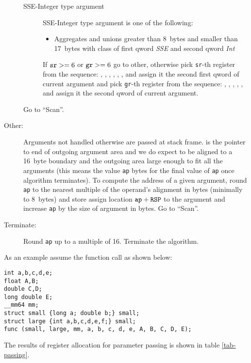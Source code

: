 \begin{description}
\begin{description}
    \item[SSE-Integer type argument]
      SSE-Integer type argument is one of the following:
      \begin{itemize}
        \item Aggregates and unions greater than 8~bytes and smaller than 17~bytes with class of first qword \emph{SSE}
          and second qword \emph{Int}
      \end{itemize}
      If $\verb|sr| >= 6$ or $\verb|gr| >= 6$ go to other, otherwise pick \verb|sr|-th register from
      the sequence:
      , , , , , , 
      and assign it the second first qword of current argument and pick \verb|gr|-th register from
      the sequence:
      \RAX, \RDX, \RCX, \RBX, \RSI, \RDI{} 
      and assign it the second qword of current argument.
   \end{description}
   Go to ``Scan''.

  \item[Other:]

    Arguments not handled otherwise are passed at stack frame. \RSP{} is the
    pointer to end of outgoing argument area and we do expect \RSP{} to be
    aligned to a 16~byte boundary and the outgoing area large enough to fit all
    the arguments (this means the value \verb|ap| bytes for the final value of
    \verb|ap| once algorithm terminates).  To compute the address of a given argument,
    round \verb|ap| to the nearest multiple of the operand's alignment in bytes
    (minimally to 8~bytes) and
    store assign location $\verb|ap|+\RSP$ to the argument and increase \verb|ap| by
    the size of argument in bytes.
    Go to ``Scan''.

  \item[Terminate:]
    Round \verb|ap| up to a multiple of 16. Terminate the algorithm.
\end{description}

As an example assume the function call as shown below:

\begin{verbatim}
int a,b,c,d,e;
float A,B;
double C,D;
long double E;
__mm64 mm;
struct small {long a; double b;} small;
struct large {int a,b,c,d,e,f;} small;
func (small, large, mm, a, b, c, d, e, A, B, C, D, E);
\end{verbatim}

The results of register allocation for parameter passing is shown in table \ref{tab-passing}.

